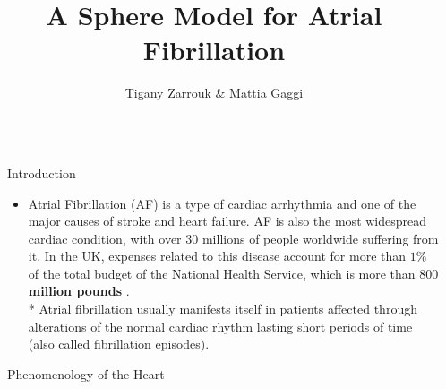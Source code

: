 \documentclass[final,hyperref={pdfpagelabels=false}]{beamer}
\title{\huge A Sphere Model for Atrial Fibrillation} %
\author{Tigany Zarrouk \& Mattia Gaggi } %
\institute{Supervisor: Kim Christensen.  Condensed Matter Theory Group---Imperial College London} %
\begin{document}

\begin{frame}[t] %

\begin{columns}[t] %

\begin{column}{.02\textwidth}\end{column} %

\begin{column}{.465\textwidth} %




            
\begin{block}{Introduction}

\begin{itemize}
\item Atrial Fibrillation (AF) is a type of cardiac arrhythmia and one of the major causes of stroke and heart failure. AF is also the most widespread cardiac condition, with over 30 millions of people worldwide suffering from it. In the UK, expenses related to this disease account for more than $1\%$ of the total budget of the National Health Service, which is more than $800$ \textbf{ million pounds} .\\*
 Atrial fibrillation usually manifests itself in patients affected through alterations of the normal cardiac rhythm lasting short periods of time (also called fibrillation episodes).\\
\end{itemize}


\end{block}


\begin{block}{Phenomenology of the Heart}



\end{block}
\end{column}
\end{columns}
\end{frame}
\end{document}
